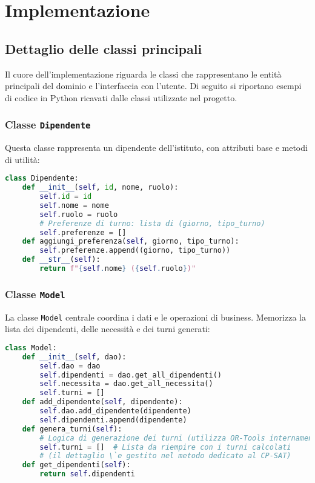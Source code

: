 \documentclass[a4paper,12pt]{report}
\begin{document}
\chapter{Implementazione}
\label{cap:implementazione}
\section{Dettaglio delle classi principali}
Il cuore dell'implementazione riguarda le classi che rappresentano le entit\`a principali del dominio e l'interfaccia con l'utente. Di seguito si riportano esempi di codice in Python ricavati dalle classi utilizzate nel progetto.

\subsection{Classe \texttt{Dipendente}}
Questa classe rappresenta un dipendente dell'istituto, con attributi base e metodi di utilit\`a:
\begin{lstlisting}[language=Python]
class Dipendente:
    def __init__(self, id, nome, ruolo):
        self.id = id
        self.nome = nome
        self.ruolo = ruolo
        # Preferenze di turno: lista di (giorno, tipo_turno)
        self.preferenze = []
    def aggiungi_preferenza(self, giorno, tipo_turno):
        self.preferenze.append((giorno, tipo_turno))
    def __str__(self):
        return f"{self.nome} ({self.ruolo})"
\end{lstlisting}

\subsection{Classe \texttt{Model}}
La classe \texttt{Model} centrale coordina i dati e le operazioni di business. Memorizza la lista dei dipendenti, delle necessit\`a e dei turni generati:
\begin{lstlisting}[language=Python]
class Model:
    def __init__(self, dao):
        self.dao = dao
        self.dipendenti = dao.get_all_dipendenti()
        self.necessita = dao.get_all_necessita()
        self.turni = []
    def add_dipendente(self, dipendente):
        self.dao.add_dipendente(dipendente)
        self.dipendenti.append(dipendente)
    def genera_turni(self):
        # Logica di generazione dei turni (utilizza OR-Tools internamente)
        self.turni = []  # Lista da riempire con i turni calcolati
        # (il dettaglio \`e gestito nel metodo dedicato al CP-SAT)
    def get_dipendenti(self):
        return self.dipendenti
\end{lstlisting}
\end{document}
